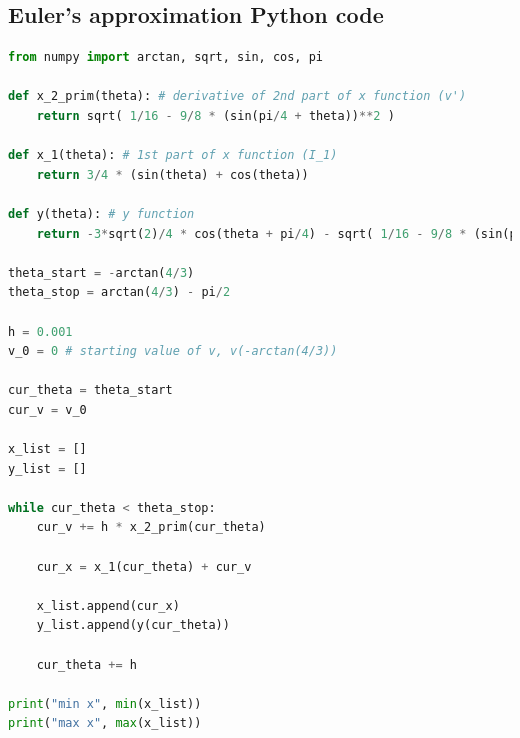 \documentclass[12pt]{article}
\begin{document}
    \subsection{Euler's approximation Python code}\label{app:euler_python}

    \begin{onehalfspace}
        
    \begin{lstlisting}[language=python]
from numpy import arctan, sqrt, sin, cos, pi

def x_2_prim(theta): # derivative of 2nd part of x function (v')
    return sqrt( 1/16 - 9/8 * (sin(pi/4 + theta))**2 )

def x_1(theta): # 1st part of x function (I_1)
    return 3/4 * (sin(theta) + cos(theta))

def y(theta): # y function
    return -3*sqrt(2)/4 * cos(theta + pi/4) - sqrt( 1/16 - 9/8 * (sin(pi/4 + theta))**2 )

theta_start = -arctan(4/3)
theta_stop = arctan(4/3) - pi/2 

h = 0.001
v_0 = 0 # starting value of v, v(-arctan(4/3))

cur_theta = theta_start
cur_v = v_0

x_list = []
y_list = []

while cur_theta < theta_stop:    
    cur_v += h * x_2_prim(cur_theta)
    
    cur_x = x_1(cur_theta) + cur_v
    
    x_list.append(cur_x)
    y_list.append(y(cur_theta))

    cur_theta += h

print("min x", min(x_list))
print("max x", max(x_list))\end{lstlisting}

    \end{onehalfspace}
\end{document}
